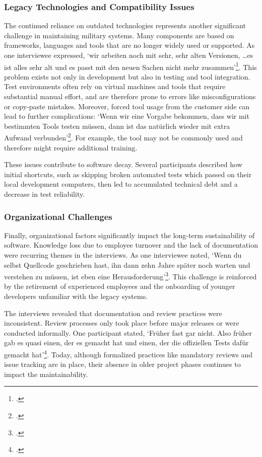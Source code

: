 \subsubsection{Legacy Technologies and Compatibility Issues}
The continued reliance on outdated technologies represents another significant challenge in maintaining military systems. Many components are based on frameworks, languages and tools that are no longer widely used or supported.
As one interviewee expressed, `wir arbeiten noch mit sehr, sehr alten Versionen, \ldots es ist alles sehr alt und es passt mit den neuen Sachen nicht mehr zusammen'\footcite[61]{Interview12025}.
This problem exists not only in development but also in testing and tool integration. Test environments often rely on virtual machines and tools that require substantial manual effort, and are therefore prone to errors like misconfigurations or copy-paste mistakes.
Moreover, forced tool usage from the customer side can lead to further complications: `Wenn wir eine Vorgabe bekommen, dass wir mit bestimmten Tools testen müssen, dann ist das natürlich wieder mit extra Aufwand verbunden'\footcite[84]{Interview32025}. For example, the tool may not be commonly used and therefore might require additional training.

These issues contribute to software decay. Several participants described how initial shortcuts, such as skipping broken automated tests which passed on their local development computers, then led to accumulated technical debt and a decrease in test reliability.

\subsubsection{Organizational Challenges}
Finally, organizational factors significantly impact the long-term sustainability of software. Knowledge loss due to employee turnover and the lack of documentation were recurring themes in the interviews.
As one interviewee noted, `Wenn du selbst Quellcode geschrieben hast, ihn dann zehn Jahre später noch warten und verstehen zu müssen, ist eben eine Herausforderung'\footcite[68]{Interview22025}. This challenge is reinforced by the retirement of experienced employees and the onboarding of younger developers
unfamiliar with the legacy systems.

The interviews revealed that documentation and review practices were inconsistent. Review processes only took place before major releases or were conducted informally. One participant stated,
`Früher fast gar nicht. Also früher gab es quasi einen, der es gemacht hat und einen, der die offiziellen Tests dafür gemacht hat'\footcite[61]{Interview12025}. Today, although formalized practices like mandatory reviews and issue tracking are in place, their absence in older project 
phases continues to impact the maintainability. 

